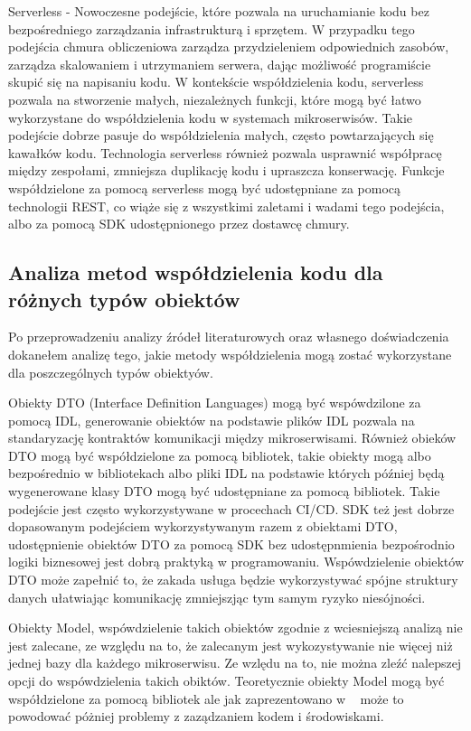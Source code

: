 \documentclass[runningheads,12pt]{llncs} \usepackage{graphicx} \usepackage{todonotes} \usepackage{fancyhdr} \usepackage{lipsum} \usepackage[T1]{fontenc} \usepackage[provide=*,english,polish]{babel}
\begin{document}
Serverless - Nowoczesne podejście, które pozwala na uruchamianie kodu bez bezpośredniego zarządzania infrastrukturą i sprzętem. W przypadku tego podejścia chmura obliczeniowa zarządza przydzieleniem odpowiednich zasobów, zarządza skalowaniem i utrzymaniem serwera, dając możliwość programiście skupić się na napisaniu kodu. W kontekście współdzielenia kodu, serverless pozwala na stworzenie małych, niezależnych funkcji, które mogą być łatwo wykorzystane do współdzielenia kodu w systemach mikroserwisów. Takie podejście dobrze pasuje do współdzielenia małych, często powtarzających się kawałków kodu. Technologia serverless również pozwala usprawnić współpracę między zespołami, zmniejsza duplikację kodu i upraszcza konserwację. Funkcje współdzielone za pomocą serverless mogą być udostępniane za pomocą technologii REST, co wiąże się z wszystkimi zaletami i wadami tego podejścia, albo za pomocą SDK udostępnionego przez dostawcę chmury.

\subsection{Analiza metod współdzielenia kodu dla różnych typów obiektów}

Po przeprowadzeniu analizy źródeł literaturowych oraz własnego doświadczenia dokanełem analizę tego, jakie metody współdzielenia mogą zostać wykorzystane dla poszczególnych typów obiektyów.

Obiekty DTO (Interface Definition Languages) mogą być wspówdzilone za pomocą IDL, generowanie obiektów na podstawie plików IDL pozwala na standaryzację kontraktów komunikacji między mikroserwisami. Również obieków DTO mogą być współdzielone za pomocą bibliotek, takie obiekty mogą albo bezpośrednio w bibliotekach albo pliki IDL na podstawie których później będą wygenerowane klasy DTO mogą być udostępniane za pomocą bibliotek. Takie podejście jest często wykorzystywane w procechach CI/CD. SDK też jest dobrze dopasowanym podejściem wykorzystywanym razem z obiektami DTO, udostępnienie obiektów DTO za pomocą SDK bez udostępnmienia bezpośrodnio logiki biznesowej jest dobrą praktyką w programowaniu. Wspówdzielenie obiektów DTO może zapełnić to, że zakada usługa będzie wykorzystywać spójne struktury danych ułatwiając komunikację zmniejszjąc tym samym ryzyko niesójności.

Obiekty Model, wspówdzielenie takich obiektów zgodnie z wciesniejszą analizą nie jest zalecane, ze względu na to, że zalecanym jest wykozystywanie nie więcej niż jednej bazy dla każdego mikroserwisu. Ze wzlędu na to, nie można zleźć nalepszej opcji do wspówdzielenia takich obiktów. Teoretycznie obiekty Model mogą być współdzielone za pomocą bibliotek ale jak zaprezentowano w ~\cite{bhuyan2020microservices} może to powodować póżniej problemy z zaządzaniem kodem i środowiskami.
\end{document}
